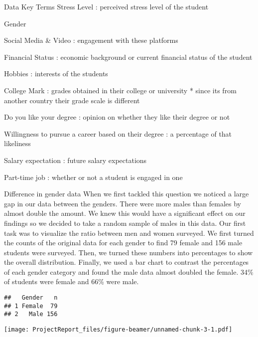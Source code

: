 \documentclass[
  ignorenonframetext,
]{beamer}
\begin{document}
\begin{frame}{Data Key Terms}
\protect\hypertarget{data-key-terms}{}
Stress Level : perceived stress level of the student

Gender

Social Media \& Video : engagement with these platforms

Financial Status : economic background or current financial status of
the student

Hobbies : interests of the students

College Mark : grades obtained in their college or university * since
its from another country their grade scale is different

Do you like your degree : opinion on whether they like their degree or
not

Willingness to pursue a career based on their degree : a percentage of
that likeliness

Salary expectation : future salary expectations

Part-time job : whether or not a student is engaged in one
\end{frame}

\begin{frame}[fragile]{Difference in gender data}
\protect\hypertarget{difference-in-gender-data}{}
When we first tackled this question we noticed a large gap in our data
between the genders. There were more males than females by almost double
the amount. We knew this would have a significant effect on our findings
so we decided to take a random sample of males in this data. Our first
task was to visualize the ratio between men and women surveyed. We first
turned the counts of the original data for each gender to find 79 female
and 156 male students were surveyed. Then, we turned these numbers into
percentages to show the overall distribution. Finally, we used a bar
chart to contrast the percentages of each gender category and found the
male data almost doubled the female. 34\% of students were female and
66\% were male.

\begin{verbatim}
##   Gender   n
## 1 Female  79
## 2   Male 156
\end{verbatim}

\texttt{[image: ProjectReport\_files/figure-beamer/unnamed-chunk-3-1.pdf]}
\end{frame}
\end{document}
